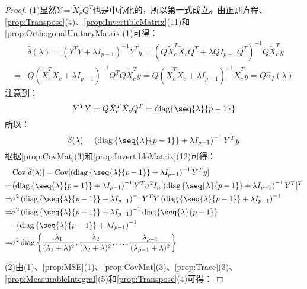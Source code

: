\begin{proof}
	(1)显然$Y=\tilde{X}_cQ^T$也是中心化的，所以第一式成立。由正则方程、\cref{prop:Transpose}(4)、\cref{prop:InvertibleMatrix}(11)和\cref{prop:OrthogonalUnitaryMatrix}(1)可得：
	\begin{align*}
		&\hat{\delta}(\lambda)=(Y^TY+\lambda I_{p-1})^{-1}Y^Ty=(Q\tilde{X}_c^T\tilde{X}_cQ^T+\lambda QI_{p-1}Q^T)^{-1}Q\tilde{X}_c^Ty \\
		=&Q(\tilde{X}_c^T\tilde{X}_c+\lambda I_{p-1})^{-1}Q^TQ\tilde{X}_c^Ty=Q(\tilde{X}_c^T\tilde{X}_c+\lambda I_{p-1})^{-1}\tilde{X}_c^Ty=Q\hat{\alpha}_I(\lambda)
	\end{align*}
	注意到：
	\begin{equation*}
		Y^TY=Q\tilde{X}_c^T\tilde{X}_cQ^T=\operatorname{diag}\{\seq{\lambda}{p-1}\}
	\end{equation*}
	所以：
	\begin{equation*}
		\hat{\delta}(\lambda)=\left(\operatorname{diag}\left\{\seq{\lambda}{p-1}\right\}+\lambda I_{p-1}\right)^{-1}Y^Ty
	\end{equation*}
	根据\cref{prop:CovMat}(3)和\cref{prop:InvertibleMatrix}(12)可得：
	\begin{align*}
		&\operatorname{Cov}[\hat{\delta}(\lambda)]=\operatorname{Cov}[\left(\operatorname{diag}\left\{\seq{\lambda}{p-1}\right\}+\lambda I_{p-1}\right)^{-1}Y^Ty] \\
		=&\left(\operatorname{diag}\left\{\seq{\lambda}{p-1}\right\}+\lambda I_{p-1}\right)^{-1}Y^T\sigma^2I_n[\left(\operatorname{diag}\left\{\seq{\lambda}{p-1}\right\}+\lambda I_{p-1}\right)^{-1}Y^T]^T \\
		=&\sigma^2\left(\operatorname{diag}\left\{\seq{\lambda}{p-1}\right\}+\lambda I_{p-1}\right)^{-1}Y^TY\left(\operatorname{diag}\left\{\seq{\lambda}{p-1}\right\}+\lambda I_{p-1}\right)^{-1} \\
		=&\sigma^2\left(\operatorname{diag}\left\{\seq{\lambda}{p-1}\right\}+\lambda I_{p-1}\right)^{-1}\operatorname{diag}\{\seq{\lambda}{p-1}\} \\
		&\cdot\left(\operatorname{diag}\left\{\seq{\lambda}{p-1}\right\}+\lambda I_{p-1}\right)^{-1} \\
		=&\sigma^2\operatorname{diag}\left\{\frac{\lambda_1}{(\lambda_1+\lambda)^2},\frac{\lambda_2}{(\lambda_2+\lambda)^2},\dots,\frac{\lambda_{p-1}}{(\lambda_{p-1}+\lambda)^2}\right\}
	\end{align*}\par
	(2)由(1)、\cref{prop:MSE}(1)、\cref{prop:CovMat}(3)、\cref{prop:Trace}(3)、\cref{prop:MeasurableIntegral}(5)和\cref{prop:Transpose}(4)可得：

\end{proof}

